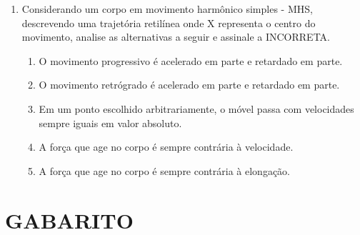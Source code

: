\documentclass[12pt,letterpaper,fleqn]{article}
\begin{document}
\begin{enumerate}
\item Considerando um corpo em movimento harmônico simples - MHS, descrevendo uma trajetória retilínea onde X representa o centro do movimento, analise as alternativas a seguir e assinale a INCORRETA.

\begin{enumerate}
    \item O movimento progressivo é acelerado em parte e retardado em parte.
    \item O movimento retrógrado é acelerado em parte e retardado em parte.
    \item Em um ponto escolhido arbitrariamente, o móvel passa com velocidades sempre iguais em valor absoluto.
    \item A força que age no corpo é sempre contrária à velocidade.
    \item A força que age no corpo é sempre contrária à elongação.
\end{enumerate}
\end{enumerate}
\newpage
\section*{GABARITO}
\end{document}
